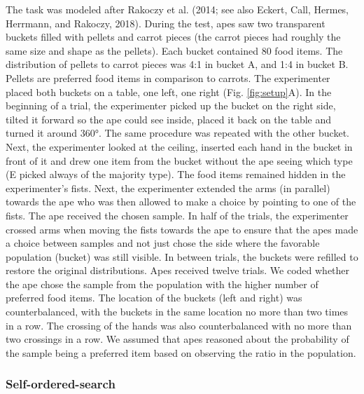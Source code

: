 \documentclass[
  man,floatsintext]{apa6}
\begin{document}
The task was modeled after Rakoczy et al. (2014; see also Eckert, Call, Hermes, Herrmann, and Rakoczy, 2018). During the test, apes saw two transparent buckets filled with pellets and carrot pieces (the carrot pieces had roughly the same size and shape as the pellets). Each bucket contained 80 food items. The distribution of pellets to carrot pieces was 4:1 in bucket A, and 1:4 in bucket B. Pellets are preferred food items in comparison to carrots. The experimenter placed both buckets on a table, one left, one right (Fig. \ref{fig:setup}A). In the beginning of a trial, the experimenter picked up the bucket on the right side, tilted it forward so the ape could see inside, placed it back on the table and turned it around 360°. The same procedure was repeated with the other bucket. Next, the experimenter looked at the ceiling, inserted each hand in the bucket in front of it and drew one item from the bucket without the ape seeing which type (E picked always of the majority type). The food items remained hidden in the experimenter's fists. Next, the experimenter extended the arms (in parallel) towards the ape who was then allowed to make a choice by pointing to one of the fists. The ape received the chosen sample. In half of the trials, the experimenter crossed arms when moving the fists towards the ape to ensure that the apes made a choice between samples and not just chose the side where the favorable population (bucket) was still visible. In between trials, the buckets were refilled to restore the original distributions. Apes received twelve trials. We coded whether the ape chose the sample from the population with the higher number of preferred food items. The location of the buckets (left and right) was counterbalanced, with the buckets in the same location no more than two times in a row. The crossing of the hands was also counterbalanced with no more than two crossings in a row. We assumed that apes reasoned about the probability of the sample being a preferred item based on observing the ratio in the population.

\subsubsection{Self-ordered-search}\label{self-ordered-search}
\end{document}
